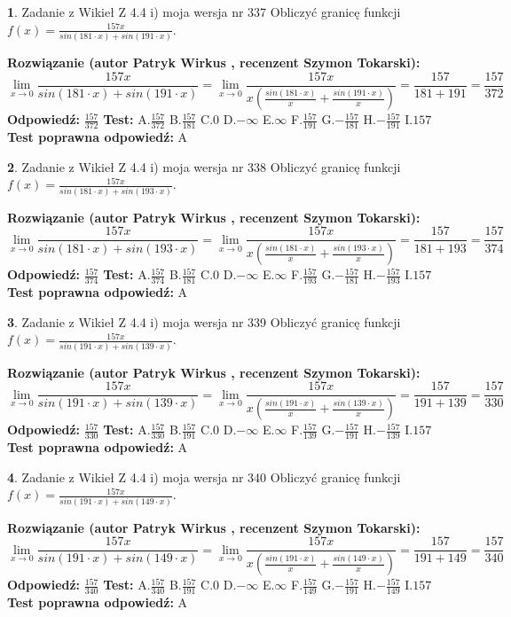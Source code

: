 \documentclass[12pt, a4paper]{article}
\theoremstyle{definition} %
\newtheorem{zad}{}
\newcommand{\zadStart}[1]{\begin{zad}#1\newline}
\newcommand{\zadStop}{\end{zad}}
\newcommand{\rozwStart}[2]{\noindent \textbf{Rozwiązanie (autor #1 , recenzent #2): }\newline}
\newcommand{\rozwStop}{\newline}
\newcommand{\odpStart}{\noindent \textbf{Odpowiedź:}\newline}
\newcommand{\odpStop}{\newline}
\newcommand{\testStart}{\noindent \textbf{Test:}\newline}
\newcommand{\testStop}{\newline}
\newcommand{\kluczStart}{\noindent \textbf{Test poprawna odpowiedź:}\newline}
\newcommand{\kluczStop}{\newline}
\begin{document}
\zadStart{Zadanie z Wikieł Z 4.4 i) moja wersja nr 337}
Obliczyć granicę funkcji $f(x)=\frac{157x}{sin(181\cdot x) +sin(191\cdot x)}$.
\zadStop
\rozwStart{Patryk Wirkus}{Szymon Tokarski}
$$\lim\limits_{x\to 0}\frac{157x}{sin(181\cdot x) +sin(191\cdot x)}=\lim\limits_{x\to 0}\frac{157x}{x(\frac{sin(181\cdot x)}{x}+\frac{sin(191\cdot x)}{x})}=\frac{157}{181+191} = \frac{157}{372}$$
\rozwStop
\odpStart
$\frac{157}{372}$
\odpStop
\testStart
A.$\frac{157}{372}$
B.$\frac{157}{181}$
C.$0$
D.$-\infty$
E.$\infty$
F.$\frac{157}{191}$
G.$-\frac{157}{181}$
H.$-\frac{157}{191}$
I.$157$
\testStop
\kluczStart
A
\kluczStop



\zadStart{Zadanie z Wikieł Z 4.4 i) moja wersja nr 338}
Obliczyć granicę funkcji $f(x)=\frac{157x}{sin(181\cdot x) +sin(193\cdot x)}$.
\zadStop
\rozwStart{Patryk Wirkus}{Szymon Tokarski}
$$\lim\limits_{x\to 0}\frac{157x}{sin(181\cdot x) +sin(193\cdot x)}=\lim\limits_{x\to 0}\frac{157x}{x(\frac{sin(181\cdot x)}{x}+\frac{sin(193\cdot x)}{x})}=\frac{157}{181+193} = \frac{157}{374}$$
\rozwStop
\odpStart
$\frac{157}{374}$
\odpStop
\testStart
A.$\frac{157}{374}$
B.$\frac{157}{181}$
C.$0$
D.$-\infty$
E.$\infty$
F.$\frac{157}{193}$
G.$-\frac{157}{181}$
H.$-\frac{157}{193}$
I.$157$
\testStop
\kluczStart
A
\kluczStop



\zadStart{Zadanie z Wikieł Z 4.4 i) moja wersja nr 339}
Obliczyć granicę funkcji $f(x)=\frac{157x}{sin(191\cdot x) +sin(139\cdot x)}$.
\zadStop
\rozwStart{Patryk Wirkus}{Szymon Tokarski}
$$\lim\limits_{x\to 0}\frac{157x}{sin(191\cdot x) +sin(139\cdot x)}=\lim\limits_{x\to 0}\frac{157x}{x(\frac{sin(191\cdot x)}{x}+\frac{sin(139\cdot x)}{x})}=\frac{157}{191+139} = \frac{157}{330}$$
\rozwStop
\odpStart
$\frac{157}{330}$
\odpStop
\testStart
A.$\frac{157}{330}$
B.$\frac{157}{191}$
C.$0$
D.$-\infty$
E.$\infty$
F.$\frac{157}{139}$
G.$-\frac{157}{191}$
H.$-\frac{157}{139}$
I.$157$
\testStop
\kluczStart
A
\kluczStop



\zadStart{Zadanie z Wikieł Z 4.4 i) moja wersja nr 340}
Obliczyć granicę funkcji $f(x)=\frac{157x}{sin(191\cdot x) +sin(149\cdot x)}$.
\zadStop
\rozwStart{Patryk Wirkus}{Szymon Tokarski}
$$\lim\limits_{x\to 0}\frac{157x}{sin(191\cdot x) +sin(149\cdot x)}=\lim\limits_{x\to 0}\frac{157x}{x(\frac{sin(191\cdot x)}{x}+\frac{sin(149\cdot x)}{x})}=\frac{157}{191+149} = \frac{157}{340}$$
\rozwStop
\odpStart
$\frac{157}{340}$
\odpStop
\testStart
A.$\frac{157}{340}$
B.$\frac{157}{191}$
C.$0$
D.$-\infty$
E.$\infty$
F.$\frac{157}{149}$
G.$-\frac{157}{191}$
H.$-\frac{157}{149}$
I.$157$
\testStop
\kluczStart
A
\kluczStop
\end{document}
